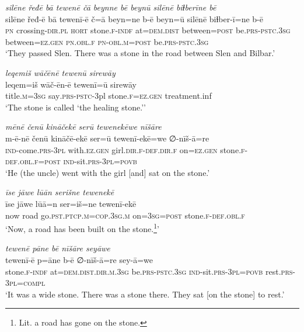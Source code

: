 \ea \label{ŽP.167}
\textit{silēne řeđē bā tewenē čā beynne bē beynū silēnē biɫberīne bē} \\ 
\gll silēne řeđ-ē bā tewenī-ē č=ā beyn=ne b-ē beyn=ū silēnē biɫber-ī=ne b-ē \\ 
 \textsc{pn} crossing\textsc{-dir}\textsc{.pl} \textsc{hort} stone\textsc{.f}\textsc{-indf} at=\textsc{dem.dist} between\textsc{=\textsc{post}} be\textsc{.prs}\textsc{-pstc}\textsc{.3sg} between\textsc{\textsc{=ez.gen}} \textsc{pn}\textsc{.obl}\textsc{.f} \textsc{pn}\textsc{-obl}\textsc{.m}\textsc{=\textsc{post}} be\textsc{.prs}\textsc{-pstc}\textsc{.3sg} \\ 
\glt `They passed Slen. There was a stone in the road between Slen and Bilbar.'
\z 
 
\ea \label{ŽP.168}
\textit{leqemiš wāčēnē tewenū sirewāy} \\ 
\gll leqem=iš wāč-ēn-ē tewenī=ū sirewāy \\ 
 title\textsc{.m}\textsc{=3sg} say\textsc{.prs-pstc}-3pl stone\textsc{.f}\textsc{\textsc{=ez.gen}} treatment.inf \\ 
\glt `The stone is called ‘the healing stone.’'
\z 
 
\ea \label{ŽP.169}
\textit{mēnē čenū kināčekē serū tewenekēwe nīšāre} \\ 
\gll m-ē-nē čenū kināčē-ekē ser=ū tewenī-ekē=we ∅-nīš-ā=re \\ 
 \textsc{ind-}come\textsc{.prs}\textsc{-3pl} with\textsc{.ez.gen} girl\textsc{.dir}\textsc{.f}\textsc{-def}\textsc{.dir}\textsc{.f} on\textsc{\textsc{=ez.gen}} stone\textsc{.f}\textsc{-def}\textsc{.obl}\textsc{.f}\textsc{=\textsc{post}} \textsc{ind-}sit\textsc{.prs}\textsc{-3pl}\textsc{=\textsc{povb}} \\ 
\glt `He (the uncle) went with the girl [and] sat on the stone.'
\z 
 
\ea \label{ŽP.170}
\textit{īse jāwe lūān serišne tewenekē} \\ 
\gll īse jāwe lūā=n ser=iš=ne tewenī-ekē \\ 
 now road go\textsc{.pst}\textsc{.ptcp}\textsc{.m}\textsc{=cop}\textsc{.3sg}\textsc{.m} on\textsc{=3sg}\textsc{=\textsc{post}} stone\textsc{.f}\textsc{-def}\textsc{.obl}\textsc{.f} \\ 
\glt `Now, a road has been built on the stone.\footnote{Lit. a road has gone on the stone.}'
\z 
 
\ea \label{ŽP.171}
\textit{tewenē pāne bē nīšāre seyāwe} \\ 
\gll tewenī-ē p=āne b-ē ∅-nīš-ā=re sey-ā=we \\ 
 stone\textsc{.f}\textsc{-indf} at=\textsc{dem.dist}\textsc{.dir}\textsc{.m}\textsc{.3sg} be\textsc{.prs}\textsc{-pstc}\textsc{.3sg} \textsc{ind-}sit\textsc{.prs}\textsc{-3pl}\textsc{=\textsc{povb}} rest\textsc{.prs}\textsc{-3pl}\textsc{=compl} \\ 
\glt `It was a wide stone. There was a stone there. They sat [on the stone] to rest.'
\z 
 
